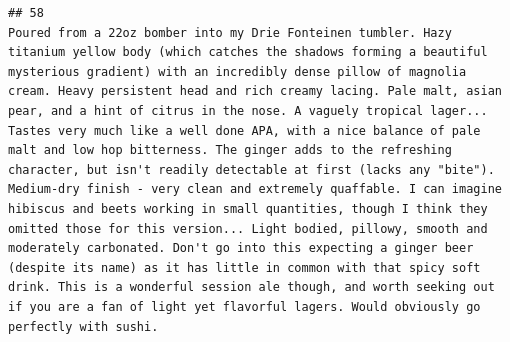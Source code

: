 \documentclass[
  a4paper,
]{article}
\begin{document}
\begin{verbatim}
## 58                                                                                                                                                                                                                                                                                                                                                                                                                                                                                                                                                                                                                                                                                                                                                                                                                                                                                                                                                                                                                                                                                  Poured from a 22oz bomber into my Drie Fonteinen tumbler. Hazy titanium yellow body (which catches the shadows forming a beautiful mysterious gradient) with an incredibly dense pillow of magnolia cream. Heavy persistent head and rich creamy lacing. Pale malt, asian pear, and a hint of citrus in the nose. A vaguely tropical lager... Tastes very much like a well done APA, with a nice balance of pale malt and low hop bitterness. The ginger adds to the refreshing character, but isn't readily detectable at first (lacks any "bite"). Medium-dry finish - very clean and extremely quaffable. I can imagine hibiscus and beets working in small quantities, though I think they omitted those for this version... Light bodied, pillowy, smooth and moderately carbonated. Don't go into this expecting a ginger beer (despite its name) as it has little in common with that spicy soft drink. This is a wonderful session ale though, and worth seeking out if you are a fan of light yet flavorful lagers. Would obviously go perfectly with sushi.

\end{verbatim}
\end{document}
